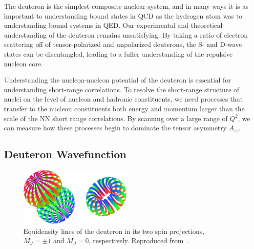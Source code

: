 

The deuteron is the simplest composite nuclear system, and in many ways it is as important to understanding bound states in QCD as the hydrogen atom was to understanding bound systems in QED.  Our experimental and theoretical understanding of the deuteron remains unsatisfying. By taking a ratio of electron scattering off of tensor-polarized and unpolarized deuterons, the S- and D-wave states can be disentangled, leading to a fuller understanding of the repulsive nucleon core. 

Understanding the nucleon-nucleon potential of the deuteron is essential for understanding short-range correlations. To resolve the short-range structure of nuclei on the level of nucleon and hadronic constituents, we need processes that transfer to the nucleon constituents both energy and momentum larger than the scale of the NN short range correlations. By scanning over a large range of $Q^2$, we can measure how these processes begin to dominate the tensor asymmetry $A_{zz}$.




\subsection{Deuteron Wavefunction}




\begin{figure}
\centering
\includegraphics[width=0.5\textwidth]{figs/deuteron_states.eps}
\caption{\label{fig:deuteron}
Equidensity lines of the deuteron in its two spin projections, $M_J=\pm 1$ and $M_J=0$, respectively. Reproduced from~\cite{Carlson:1997qn,Forest:1996kp}.
}
\end{figure}

